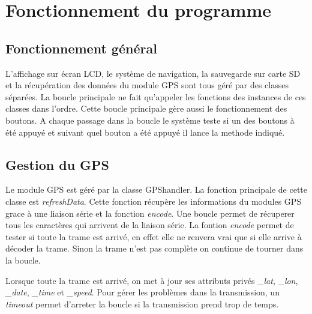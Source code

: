 \documentclass[a4paper,12pt,titlepage]{article}
\begin{document}
\section{Fonctionnement du programme}

\subsection{Fonctionnement général}

L'affichage sur écran LCD, le système de navigation, la sauvegarde sur carte SD et la récupération des données du module GPS sont tous géré par des classes séparées.
La boucle principale ne fait qu'appeler les fonctions des instances de ces classes dans l'ordre. Cette boucle principale gère aussi le fonctionnement des boutons.
A chaque passage dans la boucle le système teste si un des boutons à été appuyé et suivant quel bouton a été appuyé il lance la methode indiqué.

\subsection{Gestion du GPS}

Le module GPS est géré par la classe GPShandler.
La fonction principale de cette classe est \emph{refreshData}.
Cette fonction récupère les informations du modules GPS grace à une liaison série et la fonction \emph{encode}.
Une boucle permet de récuperer tous les caractères qui arrivent de la liaison série.
La fontion \emph{encode} permet de tester si toute la trame est arrivé, en effet elle ne renvera vrai que si elle arrive à décoder la trame. Sinon la trame n'est pas complète on continue de tourner dans la boucle.

Lorsque toute la trame est arrivé, on met à jour ses attributs privés \emph{\_lat}, \emph{\_lon}, \emph{\_date}, \emph{\_time} et \emph{\_speed}.
Pour gérer les problèmes dans la transmission, un \emph{timeout} permet d'arreter la boucle si la transmission prend trop de temps.
\end{document}

